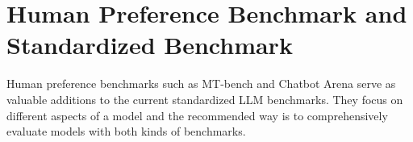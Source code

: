 \begin{table}[t]
\centering
\vspace{-1em}
\caption{Evaluation results of several model variants.}
\label{table:dataset_composition}
\scriptsize
{}
\vspace{-1.5em}
\end{table}


\section{Human Preference Benchmark and Standardized Benchmark}
\label{sec:training_data}
Human preference benchmarks such as MT-bench and Chatbot Arena serve as valuable additions to the current standardized LLM benchmarks. They focus on different aspects of a model and the recommended way is to comprehensively evaluate models with both kinds of benchmarks.

